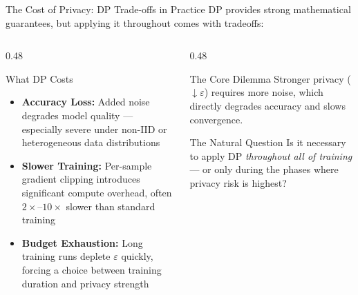 \documentclass[aspectratio=169]{beamer}
\begin{document}
\begin{frame}{The Cost of Privacy: DP Trade-offs in Practice}
    DP provides strong mathematical guarantees, but applying it throughout comes with tradeoffs:

    \vspace{0.1cm}
    \begin{columns}[T]
        \begin{column}{0.48\textwidth}
            \begin{block}{What DP Costs}
                \begin{itemize}
                    \item \textbf{Accuracy Loss:} Added noise degrades model quality — especially severe under non-IID or heterogeneous data distributions
                    \item \textbf{Slower Training:} Per-sample gradient clipping introduces significant compute overhead, often $2\times$–$10\times$ slower than standard training
                    \item \textbf{Budget Exhaustion:} Long training runs deplete $\varepsilon$ quickly, forcing a choice between training duration and privacy strength
                \end{itemize}
            \end{block}
        \end{column}
        \begin{column}{0.48\textwidth}
            \begin{alertblock}{The Core Dilemma}
                Stronger privacy ($\downarrow \varepsilon$) requires more noise, which directly degrades accuracy and slows convergence.
            \end{alertblock}
            \vspace{0.3cm}
            \begin{exampleblock}{The Natural Question}
                Is it necessary to apply DP \textit{throughout all of training} — or only during the phases where privacy risk is highest?
            \end{exampleblock}
        \end{column}
    \end{columns}
\end{frame}
\end{document}
